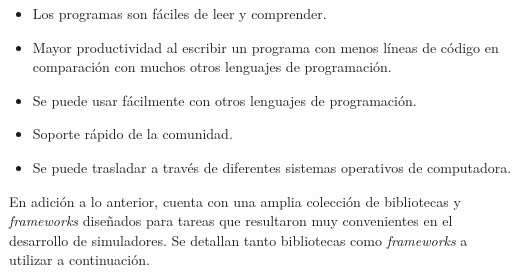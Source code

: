 \begin{itemize}
	\item Los programas son fáciles de leer y comprender.
	
	\item Mayor productividad al escribir un programa con menos líneas de código en comparación con muchos otros lenguajes de programación.
	
	\item Se puede usar fácilmente con otros lenguajes de programación.
	
	\item Soporte rápido de la comunidad.
	
	\item Se puede trasladar a través de diferentes sistemas operativos de computadora.
\end{itemize}

En adición a lo anterior, cuenta con una amplia colección de bibliotecas y \textit{frameworks} diseñados para tareas que resultaron muy convenientes en el desarrollo de simuladores. Se detallan tanto bibliotecas como \textit{frameworks} a utilizar a continuación.

